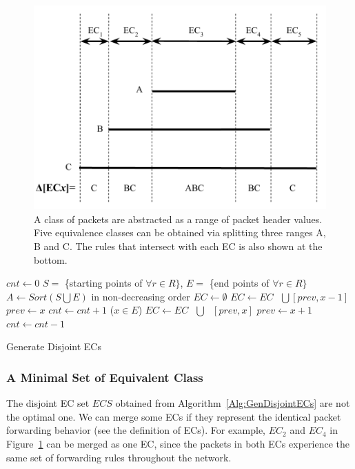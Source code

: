 \begin{figure}[t]
\centering
\includegraphics[scale=.52]{figures/DisjointECs.pdf}
\caption{A class of packets are abstracted as a range of packet header values.
        Five equivalence classes can be obtained via splitting three ranges A, B and C.
        The rules that intersect with each EC is also shown at the bottom.}
\label{Fig:DisjointECsAsInterval}
\end{figure}

\begin{algorithm}[t]
\DontPrintSemicolon
{}
$cnt \gets 0$\;
$S = $ \{starting points of $\forall r \in R\}$, $E = $ \{end points of $\forall r \in R\}$\;
$A \gets Sort(S \bigcup E)$ in non-decreasing order\;
$EC \gets \emptyset$\;
 {
         {
                 {\label{Alg:LineEndStart1} 
                        $EC \gets EC \text{ }\bigcup \text{} [prev, x-1]$\;
                }\label{Alg:LineEndStart2} 
                $prev \gets x$\;\label{Alg:LineNewPrev1}
                $cnt \gets cnt + 1$\;
        }
        \Else ($x \in E$) {
                $EC \gets EC \text{ } \bigcup \text{ } [prev, x]$\;\label{Alg:LineEndEnd}
                $prev \gets x + 1$\;\label{Alg:LineNewPrev2}
                $cnt \gets cnt - 1$\;
        }
}
\caption{Generate Disjoint ECs\label{Alg:GenDisjointECs}}
\label{algo:1}
\end{algorithm}

\subsubsection{A Minimal Set of Equivalent Class}
The disjoint EC set $ECS$ obtained from Algorithm~\ref{Alg:GenDisjointECs} are not the optimal one. 
We can merge some ECs if they represent the identical packet forwarding behavior (see the definition of ECs). 
For example, $EC_2$ and $EC_4$ in Figure~\ref{Fig:DisjointECsAsInterval} can be merged as one EC, since the packets in both ECs experience the same set of forwarding rules throughout the network. %

